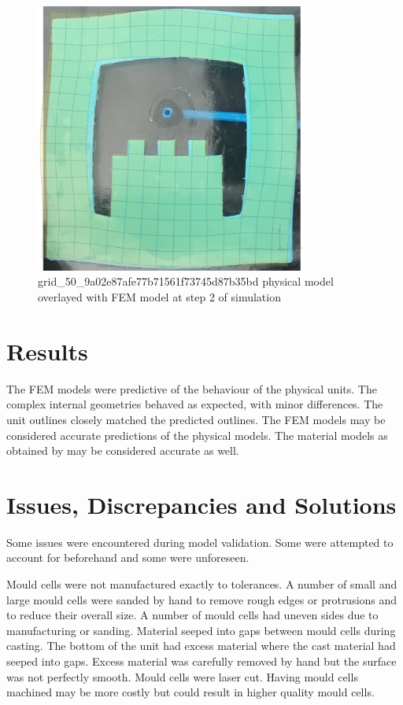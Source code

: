 \begin{figure}[H]
	\centering
	\includegraphics[width=0.8\textwidth]{unit3defover.png}
	\caption[Physical model of unit 3 overlayed with FEM model]{grid\_50\_9a02e87afe77b71561f73745d87b35bd physical model overlayed with FEM model at step 2 of simulation}
	\label{fig:unit3over}
\end{figure}

\section{Results}

The FEM models were predictive of the behaviour of the physical units. The complex internal geometries behaved as expected, with minor differences. The unit outlines closely matched the predicted outlines. The FEM models may be considered accurate predictions of the physical models. The material models as obtained by \cite{Ellis2020} may be considered accurate as well.

\section{Issues, Discrepancies and Solutions}

Some issues were encountered during model validation. Some were attempted to account for beforehand and some were unforeseen.

Mould cells were not manufactured exactly to tolerances. A number of small and large mould cells were sanded by hand to remove rough edges or protrusions and to reduce their overall size. A number of mould cells had uneven sides due to manufacturing or sanding. Material seeped into gaps between mould cells during casting. The bottom of the unit had excess material where the cast material had seeped into gaps. Excess material was carefully removed by hand but the surface was not perfectly smooth. Mould cells were laser cut. Having mould cells machined may be more costly but could result in higher quality mould cells.

